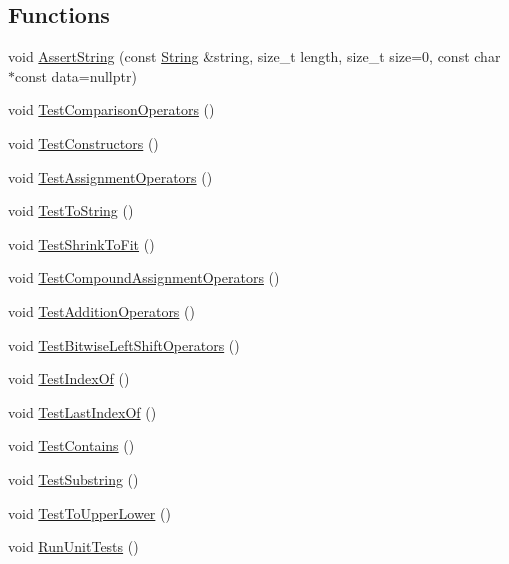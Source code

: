 \subsection*{Functions}
\begin{DoxyCompactItemize}
\item 
void \hyperlink{namespace_power_a94cb0120c19b1c711fcf5959130efc67}{Assert\+String} (const \hyperlink{class_power_1_1_string}{String} \&string, size\+\_\+t length, size\+\_\+t size=0, const char $\ast$const data=nullptr)
\item 
void \hyperlink{namespace_power_a93bc9ffcd35542cdc32911f0ab15240f}{Test\+Comparison\+Operators} ()
\item 
void \hyperlink{namespace_power_ac74fec7f3704b9c554276fa307de5bc5}{Test\+Constructors} ()
\item 
void \hyperlink{namespace_power_a1a76f10edba05c095268d242031d5544}{Test\+Assignment\+Operators} ()
\item 
void \hyperlink{namespace_power_a089aad37a74a89e886f605a3ea478664}{Test\+To\+String} ()
\item 
void \hyperlink{namespace_power_ae23123cd183d3656e9fcdb0ca4b54aab}{Test\+Shrink\+To\+Fit} ()
\item 
void \hyperlink{namespace_power_a9980a95021b19e68741111b8d706f60d}{Test\+Compound\+Assignment\+Operators} ()
\item 
void \hyperlink{namespace_power_af5fd85b391b910757cd55c237cfac27a}{Test\+Addition\+Operators} ()
\item 
void \hyperlink{namespace_power_a3d6dfcf89602f4aa5f6c078f41a9a194}{Test\+Bitwise\+Left\+Shift\+Operators} ()
\item 
void \hyperlink{namespace_power_a6dc388a4544e6d59e43eab4625af166f}{Test\+Index\+Of} ()
\item 
void \hyperlink{namespace_power_a11303f4f04e214f86e20de0b5b7c01fa}{Test\+Last\+Index\+Of} ()
\item 
void \hyperlink{namespace_power_a0746abde7fa9ae05b141ec163fb7f9fc}{Test\+Contains} ()
\item 
void \hyperlink{namespace_power_a15f3bf497eb9f54378f0e2b590802bd4}{Test\+Substring} ()
\item 
void \hyperlink{namespace_power_a8fab005f68597905871a451bac70eb1d}{Test\+To\+Upper\+Lower} ()
\item 
void \hyperlink{namespace_power_a98ecb039bc50b27644cdee95dff097d3}{Run\+Unit\+Tests} ()
\end{DoxyCompactItemize}


